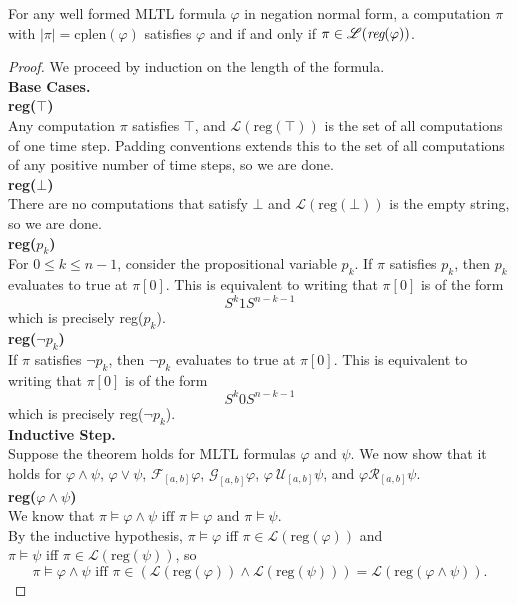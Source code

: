 \documentclass[runningheads]{llncs}
\renewcommand{\phi}{\varphi}
\begin{document}
 \begin{theorem}
 For any well formed MLTL formula $\phi$ in negation normal form, a computation $\pi$ with $|\pi| = \text{cplen}(\phi)$ satisfies $\phi$ and  if and only if $\pi \in \mathscr{L}(\emph{reg}(\phi))$.
 \end{theorem}
 \begin{proof}
 We proceed by induction on the length of the formula.\\
 
 \noindent \textbf{Base Cases.}\\
 \noindent\textbf{reg($\top$)}\\
 Any computation $\pi$ satisfies $\top$, and $\mathscr{L}(\text{reg}(\top))$ is the set of all computations of one time step. Padding conventions extends this to the set of all computations of any positive number of time steps, so we are done.\\
 
 \noindent\textbf{reg($\bot$)}\\
 There are no computations that satisfy $\bot$ and $\mathscr{L}(\text{reg}(\bot))$ is the empty string, so we are done.\\
 
 \noindent\textbf{reg($p_k$)}\\
 For $0\leq k \leq n-1$, consider the propositional variable $p_k$. If $\pi$ satisfies $p_k$, then $p_k$ evaluates to true at $\pi[0]$. This is equivalent to writing that $\pi[0]$ is of the form 
 $$S^{k} 1 S^{n-k-1}$$
 which is precisely reg($p_k$).\\
 
 \noindent\textbf{reg($\neg p_k$)}\\
 If $\pi$ satisfies $\neg p_k$, then $\neg p_k$ evaluates to true at $\pi[0]$. This is equivalent to writing that $\pi[0]$ is of the form 
 $$S^{k} 0 S^{n-k-1}$$
 which is precisely reg($\neg p_k$).\\
 
 \noindent\textbf{Inductive Step.}\\
 Suppose the theorem holds for MLTL formulas $\varphi$ and $\psi$. We now show that it holds for $\varphi \land \psi$, $\varphi \lor \psi$, $\mathcal{F}_{[a,b]} \varphi$, $\mathcal{G}_{[a,b]} \varphi$, $\varphi \ \mathcal{U}_{[a,b]} \psi$, and $\varphi \mathcal{R}_{[a,b]} \psi$.\\
 
 \noindent \textbf{reg($\varphi \land \psi$)}\\
 We know that $\pi \vDash \varphi \land \psi \text{ iff } \pi \vDash \varphi \text{ and } \pi \vDash \psi$.\\
 By the inductive hypothesis, $\pi \vDash \varphi$ iff $\pi \in \mathscr{L}(\text{reg}(\varphi))$ and 
 \\$\pi \vDash \psi$ iff $\pi \in \mathscr{L}(\text{reg}(\psi))$, so
 $$\pi \vDash \varphi \land \psi \text{ iff } \pi \in (\mathscr{L}(\text{reg}(\varphi)) \land \mathscr{L}(\text{reg}(\psi))) = \mathscr{L}(\text{reg}(\varphi \land \psi)).$$
 

\end{proof}
\end{document}
